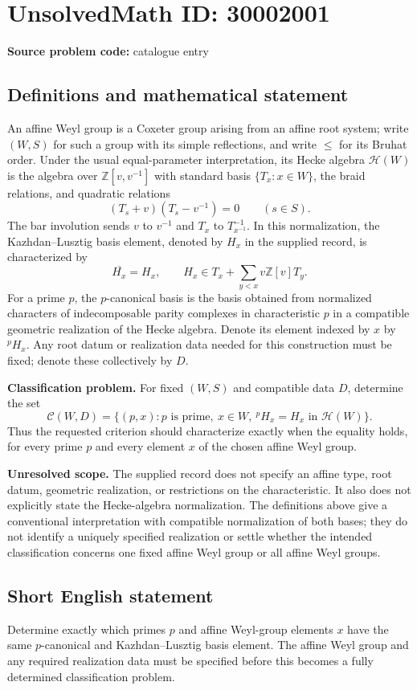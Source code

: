 \documentclass[11pt]{article}
\newcommand{\Z}{\mathbb{Z}}
\begin{document}
\section*{UnsolvedMath ID: 30002001}
\textbf{Source problem code:} catalogue entry
\subsection{Definitions and mathematical statement}
An affine Weyl group is a Coxeter group arising from an affine root system; write \((W,S)\) for such a group with its simple reflections, and write \(\leq\) for its Bruhat order. Under the usual equal-parameter interpretation, its Hecke algebra \(\mathcal H(W)\) is the algebra over \(\Z[v,v^{-1}]\) with standard basis \(\{T_x:x\in W\}\), the braid relations, and quadratic relations
\[
(T_s+v)(T_s-v^{-1})=0\qquad(s\in S).
\]
The bar involution sends \(v\) to \(v^{-1}\) and \(T_x\) to \(T_{x^{-1}}^{-1}\). In this normalization, the Kazhdan--Lusztig basis element, denoted by \(H_x\) in the supplied record, is characterized by
\[
\overline{H_x}=H_x,
\qquad
H_x\in T_x+\sum_{y<x}v\Z[v]T_y.
\]
For a prime \(p\), the \(p\)-canonical basis is the basis obtained from normalized characters of indecomposable parity complexes in characteristic \(p\) in a compatible geometric realization of the Hecke algebra. Denote its element indexed by \(x\) by \({}^{p}H_x\). Any root datum or realization data needed for this construction must be fixed; denote these collectively by \(D\).

\textbf{Classification problem.} For fixed \((W,S)\) and compatible data \(D\), determine the set
\[
\mathcal C(W,D)=\bigl\{(p,x):p\text{ is prime},\ x\in W,\ {}^{p}H_x=H_x\text{ in }\mathcal H(W)\bigr\}.
\]
Thus the requested criterion should characterize exactly when the equality holds, for every prime \(p\) and every element \(x\) of the chosen affine Weyl group.

\textbf{Unresolved scope.} The supplied record does not specify an affine type, root datum, geometric realization, or restrictions on the characteristic. It also does not explicitly state the Hecke-algebra normalization. The definitions above give a conventional interpretation with compatible normalization of both bases; they do not identify a uniquely specified realization or settle whether the intended classification concerns one fixed affine Weyl group or all affine Weyl groups.
\subsection{Short English statement}
Determine exactly which primes \(p\) and affine Weyl-group elements \(x\) have the same \(p\)-canonical and Kazhdan--Lusztig basis element. The affine Weyl group and any required realization data must be specified before this becomes a fully determined classification problem.
\end{document}

